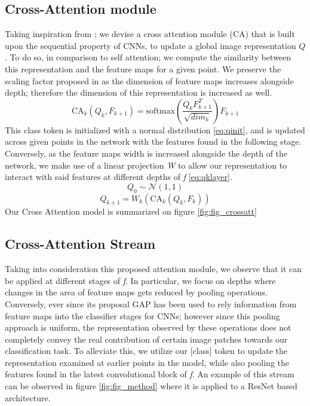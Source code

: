 \subsection{Cross-Attention module}
Taking inspiration from \cite{DBLP:journals/corr/ChengDL16}; we devise a cross attention module (CA) that is built upon the sequential property of CNNs, to update a global image representation $Q$. To do so, in comparison to self attention; we compute the similarity between this representation and the feature maps for a given point. We preserve the scaling factor proposed in \cite{NIPS2017_3f5ee243} as the dimension of feature maps increases alongside depth; therefore the dimension of this representation is increased as well.
\begin{equation}
    \mbox{CA}_k(Q_{k}, F_{k+1}) = \mbox{softmax}(\frac{Q_{k}F^T_{k+1}}{\sqrt{dim_k}})F_{k+1}
\end{equation}
This class token is initialized with a normal distribution \ref{eq:qinit}, and is updated across given points in the network with the features found in the following stage. Conversely, as the feature maps width is increased alongside the depth of the network, we make use of a linear projection \textit{W} to allow our representation to interact with said features at different depths of \textit{f} \ref{eq:qklayer}.
\begin{equation}
    Q_0 \sim \mathcal{N}(1, 1) 
    \label{eq:qinit}
\end{equation}
\begin{equation}    
    Q_{k+1} = W_k(\mbox{CA}_{k}(Q_{k}, F_{k}))
    \label{eq:qklayer}
\end{equation}
Our Cross Attention model is summarized on figure \ref{fig:fig_crossatt}


\subsection{Cross-Attention Stream}
Taking into consideration this proposed attention module, we observe that it can be applied at different stages of \textit{f}. In particular, we focus on depths where changes in the area of feature maps gets reduced by pooling operations. Conversely, ever since its proposal GAP\cite{lin2013network} has been used to rely information from feature maps into the classifier stages for CNNs; however since this pooling approach is uniform, the representation observed by these operations does not completely convey the real contribution of certain image patches towards our classification task. To alleviate this, we utilize our {[class]} token to update the representation examined at earlier points in the model, while also pooling the features found in the latest convolutional block of \textit{f}. An example of this stream can be observed in figure \ref{fig:fig_method} where it is applied to a ResNet based architecture. 

